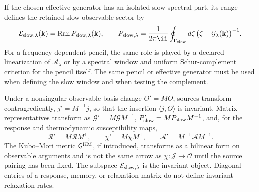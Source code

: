 \begin{definition}
If the chosen effective generator has an isolated slow spectral part, its
range defines the retained slow observable sector by
\begin{equation}
  \mathcal E_{\rm slow,\lambda}(\mathbf k)
  =
  \operatorname{Ran}P_{\rm slow,\lambda}(\mathbf k),
  \qquad
  P_{\rm slow,\lambda}
  =
  \frac{1}{2\pi\ii}
  \oint_{\Gamma_{\rm slow}}
  d\zeta\,
  \bigl(\zeta-\mathcal G_\lambda(\mathbf k)\bigr)^{-1}.
  \label{eq:hydro-retained-slow-sector}
\end{equation}
For a frequency-dependent pencil, the same role is played by a declared
linearization of \(\mathcal A_\lambda\) or by a spectral window and uniform
Schur-complement criterion for the pencil itself.  The same pencil or
effective generator must be used when defining the slow window and when
testing the complement.

Under a nonsingular observable basis change \(O'=MO\), sources transform
contragrediently, \(j'=M^{-\mathsf T}j\), so that the insertion
\(\langle j,O\rangle\) is invariant.  Matrix representatives transform as
\(\mathcal G'=M\mathcal G M^{-1}\), \(P'_{\rm slow}=MP_{\rm slow}M^{-1}\),
and, for the response and thermodynamic susceptibility maps,
\[
  \mathcal R'=M\mathcal R M^{\mathsf T},
  \qquad
  \chi'=M\chi M^{\mathsf T},
  \qquad
  \mathcal A'=M^{-\mathsf T}\mathcal A M^{-1}.
\]
The Kubo--Mori metric \(\mathsf G^{\rm KM}\), if introduced, transforms as a
bilinear form on observable arguments and is not the same arrow as
\(\chi:\mathcal J\to\mathcal O\) until the source pairing has been fixed.  The
subspace
\(\mathcal E_{\rm slow,\lambda}\) is the invariant object.  Diagonal entries
of a response, memory, or relaxation matrix do not define invariant
relaxation rates.


\end{definition}
